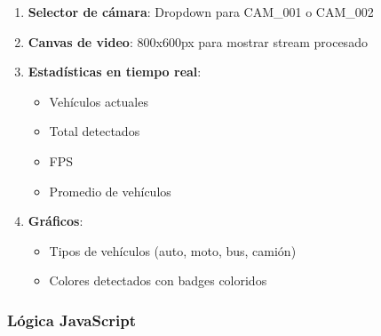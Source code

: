 \documentclass[12pt,a4paper]{article}
\begin{document}
\begin{enumerate}
    \item \textbf{Selector de cámara}: Dropdown para CAM\_001 o CAM\_002
    \item \textbf{Canvas de video}: 800x600px para mostrar stream procesado
    \item \textbf{Estadísticas en tiempo real}:
        \begin{itemize}
            \item Vehículos actuales
            \item Total detectados
            \item FPS
            \item Promedio de vehículos
        \end{itemize}
    \item \textbf{Gráficos}:
        \begin{itemize}
            \item Tipos de vehículos (auto, moto, bus, camión)
            \item Colores detectados con badges coloridos
        \end{itemize}
\end{enumerate}

\subsubsection{Lógica JavaScript}
\end{document}
